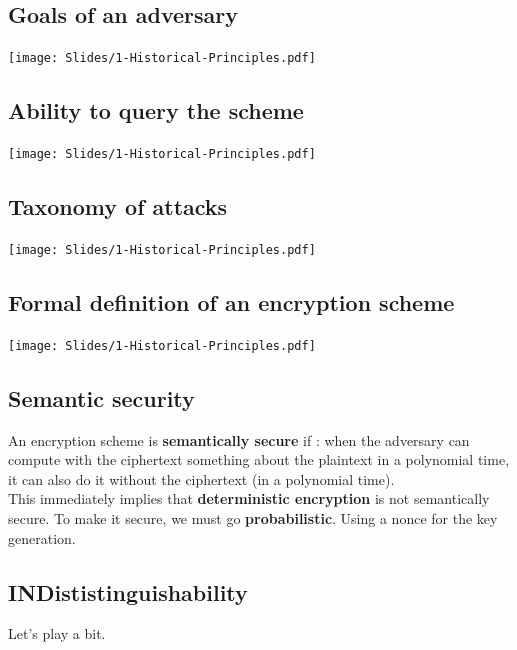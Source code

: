 \documentclass[a4paper, 12pt]{book}
\begin{document}
\subsection{Goals of an adversary}
\texttt{[image: Slides/1-Historical-Principles.pdf]} 

\subsection{Ability to query the scheme}
\texttt{[image: Slides/1-Historical-Principles.pdf]} 

\subsection{Taxonomy of attacks}
\texttt{[image: Slides/1-Historical-Principles.pdf]}

\subsection{Formal definition of an encryption scheme}
\texttt{[image: Slides/1-Historical-Principles.pdf]} 

\subsection{Semantic security}
An encryption scheme is \textbf{semantically secure} if : when the adversary can compute  with the ciphertext something about the plaintext in a polynomial time, it can also do it without the ciphertext (in a polynomial time). \\

This immediately implies that \textbf{deterministic encryption} is not semantically secure. To make it secure, we must go \textbf{probabilistic}. Using a nonce for the key generation.


\subsection{INDististinguishability}
Let's play a bit.
\end{document}
